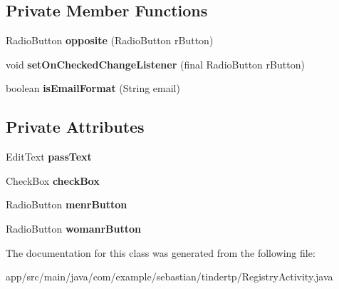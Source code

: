\subsection*{Private Member Functions}
\begin{DoxyCompactItemize}
\item 
Radio\+Button {\bfseries opposite} (Radio\+Button r\+Button)\hypertarget{classcom_1_1example_1_1sebastian_1_1tindertp_1_1RegistryActivity_a6525e74987d8dd7addb08d4afcbfcab1}{}\label{classcom_1_1example_1_1sebastian_1_1tindertp_1_1RegistryActivity_a6525e74987d8dd7addb08d4afcbfcab1}

\item 
void {\bfseries set\+On\+Checked\+Change\+Listener} (final Radio\+Button r\+Button)\hypertarget{classcom_1_1example_1_1sebastian_1_1tindertp_1_1RegistryActivity_a07db86618d9340272335484f2de24caa}{}\label{classcom_1_1example_1_1sebastian_1_1tindertp_1_1RegistryActivity_a07db86618d9340272335484f2de24caa}

\item 
boolean {\bfseries is\+Email\+Format} (String email)\hypertarget{classcom_1_1example_1_1sebastian_1_1tindertp_1_1RegistryActivity_a74ab24526643c08e7869c28fa46a3cf1}{}\label{classcom_1_1example_1_1sebastian_1_1tindertp_1_1RegistryActivity_a74ab24526643c08e7869c28fa46a3cf1}

\end{DoxyCompactItemize}
\subsection*{Private Attributes}
\begin{DoxyCompactItemize}
\item 
Edit\+Text {\bfseries pass\+Text}\hypertarget{classcom_1_1example_1_1sebastian_1_1tindertp_1_1RegistryActivity_a8c255ef50f0e59664d360cbfcf735720}{}\label{classcom_1_1example_1_1sebastian_1_1tindertp_1_1RegistryActivity_a8c255ef50f0e59664d360cbfcf735720}

\item 
Check\+Box {\bfseries check\+Box}\hypertarget{classcom_1_1example_1_1sebastian_1_1tindertp_1_1RegistryActivity_a0b83a67a48b121384d15a4558ae271d9}{}\label{classcom_1_1example_1_1sebastian_1_1tindertp_1_1RegistryActivity_a0b83a67a48b121384d15a4558ae271d9}

\item 
Radio\+Button {\bfseries menr\+Button}\hypertarget{classcom_1_1example_1_1sebastian_1_1tindertp_1_1RegistryActivity_a5ad51b456ed80d9581713496ae51031b}{}\label{classcom_1_1example_1_1sebastian_1_1tindertp_1_1RegistryActivity_a5ad51b456ed80d9581713496ae51031b}

\item 
Radio\+Button {\bfseries womanr\+Button}\hypertarget{classcom_1_1example_1_1sebastian_1_1tindertp_1_1RegistryActivity_a3c63b9b1730c42df661423490c39d175}{}\label{classcom_1_1example_1_1sebastian_1_1tindertp_1_1RegistryActivity_a3c63b9b1730c42df661423490c39d175}

\end{DoxyCompactItemize}


The documentation for this class was generated from the following file\+:\begin{DoxyCompactItemize}
\item 
app/src/main/java/com/example/sebastian/tindertp/Registry\+Activity.\+java\end{DoxyCompactItemize}
